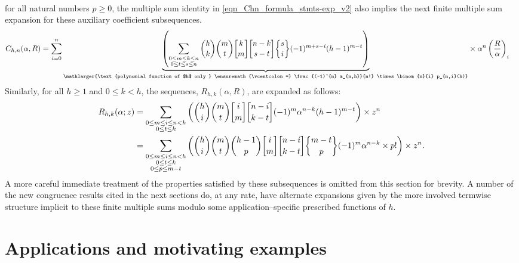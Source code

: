 \documentclass[12pt,reqno]{article}
\renewenvironment{subequations}{%
  \refstepcounter{equation}%
  \edef\theparentequation{\theequation}%
  \setcounter{parentequation}{\value{equation}}%
  \setcounter{equation}{0}%
  \def\theequation{\theparentequation.\alph{equation}}%
  \ignorespaces
}{%
  \setcounter{equation}{\value{parentequation}}%
  \ignorespacesafterend
}
\numberwithin{sfootnote}{section}
\numberwithin{equation}{section}
\theoremstyle{plain}
\theoremstyle{definition}
\theoremstyle{remark}
\newcommand{\defequals}{\ensuremath{\vcentcolon=}}
\newcommand{\gkpSI}[2]{\ensuremath{\genfrac{\lbrack}{\rbrack}{0pt}{}{#1}{#2}}}
\newcommand{\gkpSII}[2]{\ensuremath{\genfrac{\{}{\}}{0pt}{}{#1}{#2}}}
\newcommand{\Pochhammer}[2]{\ensuremath{\left(#1\right)_{#2}}}
\begin{document}
\begin{subequations}
\begin{align*}
\end{align*} 
for all natural numbers $p \geq 0$, the multiple sum identity in 
\eqref{eqn_Chn_formula_stmts-exp_v2} also implies the next finite multiple sum 
expansion for these auxiliary coefficient subsequences. 
\begin{align} 
\label{eqn_Chn_formula_stmts-exp_v5}
C_{h,n}(\alpha, R) & = 
     \sum_{i=0}^{n} 
     \underset{\mathlarger{\text{polynomial function of $h$ only } \defequals 
               \frac{(-1)^{n} m_{n,h}}{n!} \times \binom{n}{i} p_{n,i}(h)}}{ 
               \underbrace{ 
     \left( 
     \sum\limits_{\substack{0 \leq m \leq k \leq n \\ 
                            0 \leq t \leq s \leq n} 
                 } 
     \binom{h}{k} \binom{m}{t} \gkpSI{k}{m} \gkpSI{n-k}{s-t} \gkpSII{s}{i} 
     (-1)^{m+s-i} (h-1)^{m-t} 
     \right) 
     } 
     } 
     \times \alpha^{n} \Pochhammer{\frac{R}{\alpha}}{i} 
\end{align} 
\end{subequations} 
Similarly, for all $h \geq 1$ and $0 \leq k < h$, the sequences, 
$R_{h,k}(\alpha, R)$, are expanded as follows: 
\begin{align} 
\label{eqn_Rhk_formula_stmts} 
R_{h,k}(\alpha; z) & = 
     \sum\limits_{\substack{0 \leq m \leq i \leq n < h \\ 
                            0 \leq t \leq k} 
                 } 
     \left( 
     \binom{h}{i} \binom{m}{t} \gkpSI{i}{m} \gkpSI{n-i}{k-t} 
     (-1)^{m} \alpha^{n-k} (h-1)^{m-t} 
     \right) \times z^{n} \\ 
\notag 
   & = 
     \sum\limits_{\substack{0 \leq m \leq i \leq n < h \\ 
                            0 \leq t \leq k \\ 0 \leq p \leq m-t} 
                 } 
     \left( 
     \binom{h}{i} \binom{m}{t} \binom{h-1}{p} 
     \gkpSI{i}{m} \gkpSI{n-i}{k-t} \gkpSII{m-t}{p} 
     (-1)^{m} \alpha^{n-k} \times p! 
     \right) \times z^{n}. 
\end{align} 
A more careful immediate 
treatment of the properties satisfied by these subsequences is omitted 
from this section for brevity. 
A number of the new congruence results cited in the next sections do, 
at any rate, 
have alternate expansions given by the more involved termwise structure 
implicit to these finite multiple sums modulo some 
application--specific prescribed functions of $h$. 

\section{Applications and motivating examples} 
\label{Section_Apps_and_Examples} 
\end{document}
